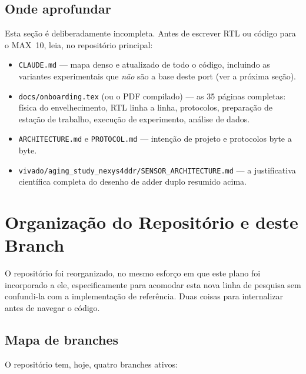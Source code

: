\documentclass[11pt,a4paper]{article}
\begin{document}
\subsection{Onde aprofundar}

Esta seção é deliberadamente incompleta. Antes de escrever RTL ou código para o
MAX~10, leia, no repositório principal:

\begin{itemize}
  \item \texttt{CLAUDE.md} --- mapa denso e atualizado de todo o código, incluindo
        as variantes experimentais que \emph{não} são a base deste port (ver a
        próxima seção).
  \item \texttt{docs/onboarding.tex} (ou o PDF compilado) --- as 35 páginas
        completas: física do envelhecimento, RTL linha a linha, protocolos,
        preparação de estação de trabalho, execução de experimento, análise de
        dados.
  \item \texttt{ARCHITECTURE.md} e \texttt{PROTOCOL.md} --- intenção de projeto e
        protocolos byte a byte.
  \item \texttt{vivado/aging\_study\_nexys4ddr/SENSOR\_ARCHITECTURE.md} --- a
        justificativa científica completa do desenho de adder duplo resumido acima.
\end{itemize}

\section{Organização do Repositório e deste Branch}
\label{sec:repo-org}

O repositório foi reorganizado, no mesmo esforço em que este plano foi incorporado a
ele, especificamente para acomodar esta nova linha de pesquisa sem confundi-la com a
implementação de referência. Duas coisas para internalizar antes de navegar o código.

\subsection{Mapa de branches}

O repositório tem, hoje, quatro branches ativos:
\end{document}
